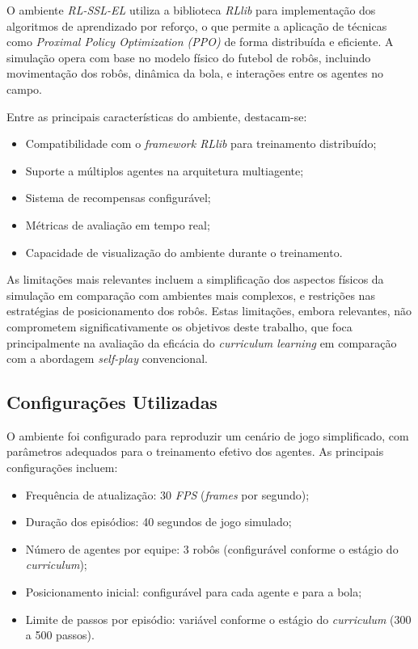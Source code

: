 O ambiente \textit{RL-SSL-EL} utiliza a biblioteca \textit{RLlib} para implementação dos algoritmos de aprendizado por reforço, o que permite a aplicação de técnicas como \textit{Proximal Policy Optimization (PPO)} de forma distribuída e eficiente. A simulação opera com base no modelo físico do futebol de robôs, incluindo movimentação dos robôs, dinâmica da bola, e interações entre os agentes no campo.

Entre as principais características do ambiente, destacam-se:

\begin{itemize}
    \item Compatibilidade com o \textit{framework RLlib} para treinamento distribuído;
    \item Suporte a múltiplos agentes na arquitetura multiagente;
    \item Sistema de recompensas configurável;
    \item Métricas de avaliação em tempo real;
    \item Capacidade de visualização do ambiente durante o treinamento.
\end{itemize}

As limitações mais relevantes incluem a simplificação dos aspectos físicos da simulação em comparação com ambientes mais complexos, e restrições nas estratégias de posicionamento dos robôs. Estas limitações, embora relevantes, não comprometem significativamente os objetivos deste trabalho, que foca principalmente na avaliação da eficácia do \textit{curriculum learning} em comparação com a abordagem \textit{self-play} convencional.

\subsection{Configurações Utilizadas}

O ambiente foi configurado para reproduzir um cenário de jogo simplificado, com parâmetros adequados para o treinamento efetivo dos agentes. As principais configurações incluem:

\begin{itemize}
    \item Frequência de atualização: 30 \textit{FPS} (\textit{frames} por segundo);
    \item Duração dos episódios: 40 segundos de jogo simulado;
    \item Número de agentes por equipe: 3 robôs (configurável conforme o estágio do \textit{curriculum});
    \item Posicionamento inicial: configurável para cada agente e para a bola;
    \item Limite de passos por episódio: variável conforme o estágio do \textit{curriculum} (300 a 500 passos).
\end{itemize}

